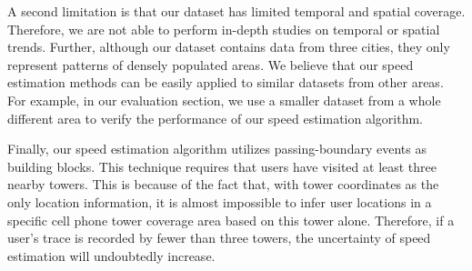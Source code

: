 
A second limitation is that our dataset has limited temporal and spatial coverage. Therefore, we are not able to perform in-depth studies on temporal or spatial trends. Further, although our dataset contains data from three cities, they only represent patterns of densely populated areas. We believe that our speed estimation methods can be easily applied to similar datasets from other areas. For example, in our evaluation section, we use a smaller dataset from a whole different area to verify the performance of our speed estimation algorithm.


Finally, our speed estimation algorithm utilizes passing-boundary events as building blocks. This technique requires that users have visited at least three nearby towers. This is because of the fact that, with tower coordinates as the only location information, it is almost impossible to infer user locations in a specific cell phone tower coverage area based on this tower alone. Therefore, if a user's trace is recorded by fewer than three towers, the uncertainty of speed estimation will undoubtedly increase.
